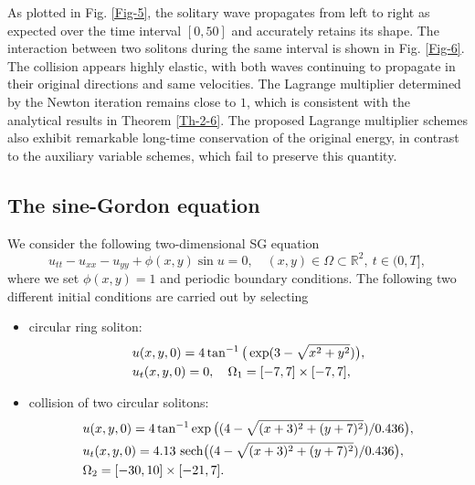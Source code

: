 \documentclass[onefignum,onetabnum]{siamart}
\begin{document}
As plotted in Fig. \ref{Fig-5}, the solitary wave propagates from left to right as expected over the time interval $[0,50]$ and accurately retains its shape. The interaction between two solitons during the same interval is shown in Fig. \ref{Fig-6}. The collision appears highly elastic, with both waves continuing to propagate in their original directions and same velocities. The Lagrange multiplier determined by the Newton iteration remains close to $1$, which is consistent with the analytical results in Theorem \ref{Th-2-6}. The proposed Lagrange multiplier schemes also exhibit remarkable long-time conservation of the original energy, in contrast to the auxiliary variable schemes, which fail to preserve this quantity.

\subsection{The sine-Gordon equation}
We consider the following two-dimensional SG equation
\begin{equation*}
	u_{tt}-u_{xx}-u_{yy}+\phi(x,y)\sin u=0,\quad (x,y)\in\Omega\subset\mathbb{R}^2,\ t\in (0,T],
\end{equation*} 
where we set $\phi(x,y)=1$ and periodic boundary conditions. The following two different initial conditions \cite{jiang-19-SG-IEQ-JSC} are carried out by selecting
\begin{itemize}
\item[{(1)}]circular ring soliton:
\begin{align*}
	\aligned
	&u(x,y,0)=4\tan^{-1}\big(\exp(3-\sqrt{x^2+y^2})\big),\\
	&u_t(x,y,0)=0,\quad \Omega_1=[-7,7]\times[-7,7],
	\endaligned
\end{align*}
\item[{(2)}]collision of two circular solitons:
\begin{align*}
	\aligned
	&u(x,y,0)=4\tan^{-1}\exp\big((4-\sqrt{(x+3)^2+(y+7)^2})/0.436\big),\\
	&u_t(x,y,0)=4.13~\mbox{sech}\big((4-\sqrt{(x+3)^2+(y+7)^2})/0.436\big),\\
	&\Omega_2=[-30,10]\times[-21,7].
	\endaligned
\end{align*}
\end{itemize} 
\end{document}
